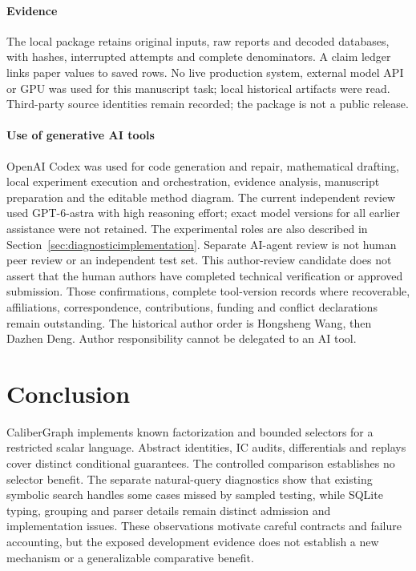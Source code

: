 \documentclass[3p,times,authoryear]{elsarticle}
\begin{document}
\paragraph{Evidence}
The local package retains original inputs, raw reports and decoded databases, with hashes, interrupted attempts and complete denominators. A claim ledger links paper values to saved rows. No live production system, external model API or GPU was used for this manuscript task; local historical artifacts were read. Third-party source identities remain recorded; the package is not a public release.

\paragraph{Use of generative AI tools}
OpenAI Codex was used for code generation and repair, mathematical drafting, local experiment execution and orchestration, evidence analysis, manuscript preparation and the editable method diagram. The current independent review used GPT-6-astra with high reasoning effort; exact model versions for all earlier assistance were not retained. The experimental roles are also described in Section~\ref{sec:diagnosticimplementation}. Separate AI-agent review is not human peer review or an independent test set. This author-review candidate does not assert that the human authors have completed technical verification or approved submission. Those confirmations, complete tool-version records where recoverable, affiliations, correspondence, contributions, funding and conflict declarations remain outstanding. The historical author order is Hongsheng Wang, then Dazhen Deng. Author responsibility cannot be delegated to an AI tool.

\section{Conclusion}
CaliberGraph implements known factorization and bounded selectors for a restricted scalar language. Abstract identities, IC audits, differentials and replays cover distinct conditional guarantees. The controlled comparison establishes no selector benefit. The separate natural-query diagnostics show that existing symbolic search handles some cases missed by sampled testing, while SQLite typing, grouping and parser details remain distinct admission and implementation issues. These observations motivate careful contracts and failure accounting, but the exposed development evidence does not establish a new mechanism or a generalizable comparative benefit.



\end{document}
